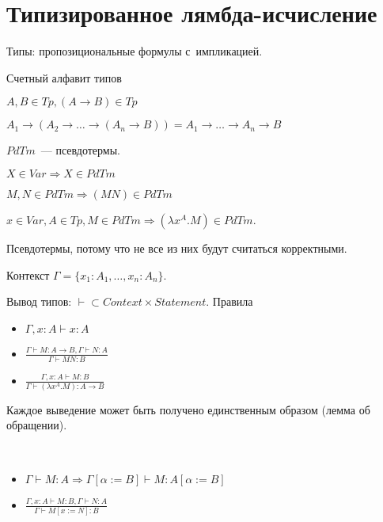 \documentclass{article}
\begin{document}
\section{Типизированное лямбда-исчисление}

Типы: пропозициональные формулы с~импликацией.

\begin{definition}
	Счетный алфавит типов

	$A, B \in Tp, (A \rightarrow B) \in Tp$

	$A_1 \rightarrow (A_2 \rightarrow \ldots \rightarrow (A_n \rightarrow B)) = A_1 \rightarrow \ldots
	\rightarrow A_n \rightarrow B$
\end{definition}

\begin{definition}
$PdTm$~--- псевдотермы.

$X \in Var \Rightarrow X \in PdTm$

$M, N \in PdTm \Rightarrow (MN) \in PdTm$

$x \in Var, A \in Tp, M \in PdTm \Rightarrow (\lambda x^A.M) \in PdTm$.
\end{definition}

Псевдотермы, потому что не все из них будут считаться корректными.

Контекст $\Gamma = \{x_1: A_1, \ldots, x_n: A_n\}$.

Вывод типов: $\vdash \subset Context \times Statement$. Правила

\begin{itemize}
	\item $\Gamma, x: A \vdash x: A$
	\item $\frac{\Gamma \vdash M: A \rightarrow B, \Gamma \vdash N: A}{\Gamma \vdash MN: B}$
	\item $\frac{\Gamma, x: A \vdash M: B}{\Gamma \vdash (\lambda x^A.M): A \rightarrow B}$
\end{itemize}

Каждое выведение может быть получено единственным образом (лемма об обращении).

\begin{lemma}[О~подстановке]~
	\begin{itemize}
		\item $\Gamma \vdash M: A \Rightarrow \Gamma[\alpha:= B] \vdash M:A[\alpha:=B]$
		\item $\frac{\Gamma, x:A \vdash M: B, \Gamma \vdash N: A}{\Gamma \vdash M[x:=N]:B}$
	\end{itemize}
\end{lemma}
\end{document}
